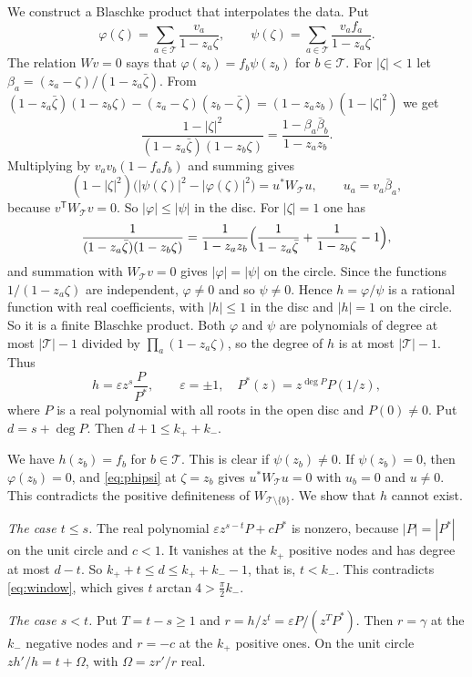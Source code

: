 \documentclass[11pt]{amsart}
\theoremstyle{definition}
\theoremstyle{remark}
\numberwithin{equation}{section}
\begin{document}
We construct a Blaschke product that interpolates the data. Put
\[
 \varphi(\zeta)=\sum_{a\in\mathcal T}\frac{v_a}{1-z_a\zeta},\qquad \psi(\zeta)=\sum_{a\in\mathcal T}\frac{v_af_a}{1-z_a\zeta}.
\]
The relation $Wv=0$ says that $\varphi(z_b)=f_b\psi(z_b)$ for $b\in\mathcal T$. For $|\zeta|<1$ let $\beta_a=(z_a-\zeta)/(1-z_a\bar\zeta)$. From
$(1-z_a\bar\zeta)(1-z_b\zeta)-(z_a-\zeta)(z_b-\bar\zeta)=(1-z_az_b)(1-|\zeta|^2)$ we get
\[
 \frac{1-|\zeta|^2}{(1-z_a\bar\zeta)(1-z_b\zeta)}=\frac{1-\beta_a\bar\beta_b}{1-z_az_b}.
\]
Multiplying by $v_av_b(1-f_af_b)$ and summing gives
\begin{equation}\label{eq:phipsi}
 (1-|\zeta|^2)\bigl(|\psi(\zeta)|^2-|\varphi(\zeta)|^2\bigr)=u^*W_{\mathcal T}u,\qquad u_a=v_a\bar\beta_a,
\end{equation}
because $v^{\mathsf T}W_{\mathcal T}v=0$. So $|\varphi|\le|\psi|$ in the disc. For $|\zeta|=1$ one has
\[
 \frac1{(1-z_a\bar\zeta)(1-z_b\zeta)}=\frac1{1-z_az_b}\Bigl(\frac1{1-z_a\bar\zeta}+\frac1{1-z_b\zeta}-1\Bigr),
\]
and summation with $W_{\mathcal T}v=0$ gives $|\varphi|=|\psi|$ on the circle. Since the functions $1/(1-z_a\zeta)$ are independent, $\varphi\ne0$ and so $\psi\ne0$.
Hence $h=\varphi/\psi$ is a rational function with real coefficients, with $|h|\le1$ in the disc and $|h|=1$ on the circle. So it is a finite
Blaschke product. Both $\varphi$ and $\psi$ are polynomials of degree at most $|\mathcal T|-1$ divided by $\prod_a(1-z_a\zeta)$, so the degree of $h$ is at most
$|\mathcal T|-1$. Thus
\[
 h=\varepsilon z^s\frac{P}{P^*},\qquad \varepsilon=\pm1,\quad P^*(z)=z^{\deg P}P(1/z),
\]
where $P$ is a real polynomial with all roots in the open disc and $P(0)\ne0$. Put $d=s+\deg P$. Then $d+1\le k_++k_-$.

We have $h(z_b)=f_b$ for $b\in\mathcal T$. This is clear if $\psi(z_b)\ne0$. If $\psi(z_b)=0$, then $\varphi(z_b)=0$, and \eqref{eq:phipsi} at $\zeta=z_b$ gives $u^*W_{\mathcal T}u=0$
with $u_b=0$ and $u\ne0$. This contradicts the positive definiteness of $W_{\mathcal T\setminus\{b\}}$. We show that $h$ cannot exist.

\emph{The case $t\le s$.} The real polynomial $\varepsilon z^{s-t}P+cP^*$ is nonzero, because $|P|=|P^*|$ on the
unit circle and $c<1$. It vanishes at the $k_+$ positive nodes and has degree at most $d-t$. So $k_++t\le d\le
k_++k_--1$, that is, $t<k_-$. This contradicts \eqref{eq:window}, which gives $t\arctan4>\frac\pi2k_-$.

\emph{The case $s<t$.} Put $T=t-s\ge1$ and $r=h/z^t=\varepsilon P/(z^TP^*)$. Then $r=\gamma$ at the $k_-$ negative
nodes and $r=-c$ at the $k_+$ positive ones. On the unit circle $zh'/h=t+\Omega$, with $\Omega=zr'/r$ real.
\end{document}

